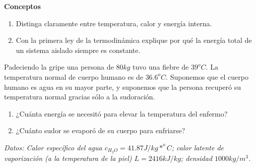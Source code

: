 \begin{mdframed}[style=warning]
	\textbf{Conceptos}
		\begin{enumerate}
			\item Distinga claramente entre temperatura, calor y energía interna.
			\item Con la primera ley de la termodinámica explique por qué la energía total de un sistema aislado siempre es constante.
		\end{enumerate}
\end{mdframed}


















\begin{mdframed}[style=warning]
	\begin{ejercicio}
		Padeciendo la gripe una persona de $80kg$ tuvo una fiebre de $39^o C$. La temperatura normal de cuerpo humano es de $36.6^o C$. Suponemos que el cuerpo humano es agua en su mayor parte, y suponemos que la persona recuperó su temperatura normal gracias sólo a la sudoración.
		\begin{enumerate}
			\item ¿Cuánta energía se necesitó para elevar la temperatura del enfermo?
			\item ¿Cuánto sudor se evaporó de su cuerpo para enfriarse?
		\end{enumerate}
		{\textit{Datos: Calor específico del agua $c_{H_2 O} = 41.87 J/kg*^o C$; calor latente de vaporización (a la temperatura de la piel) $L = 2416 kJ/kg$; densidad $1000 kg/m^3$.}}
	\end{ejercicio}
\end{mdframed}




















